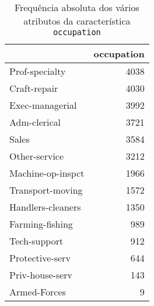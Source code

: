 \begin{table}
\centering
\caption{Frequência absoluta dos vários atributos da característica \texttt{occupation}}
\begin{tabular}{lr}
\toprule
{} &  occupation \\
\midrule
 Prof-specialty    &        4038 \\
 Craft-repair      &        4030 \\
 Exec-managerial   &        3992 \\
 Adm-clerical      &        3721 \\
 Sales             &        3584 \\
 Other-service     &        3212 \\
 Machine-op-inspct &        1966 \\
 Transport-moving  &        1572 \\
 Handlers-cleaners &        1350 \\
 Farming-fishing   &         989 \\
 Tech-support      &         912 \\
 Protective-serv   &         644 \\
 Priv-house-serv   &         143 \\
 Armed-Forces      &           9 \\
\bottomrule
\end{tabular}
\end{table}
